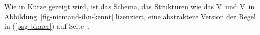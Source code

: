 Wie in Kürze gezeigt wird, ist das Schema, das Strukturen wie das V\,\eliste{} und V\, in
Abbildung~\ref{fig-niemand-ihn-kennt} lizenziert, eine abstraktere Version der Regel in (\ref{psg-binaer}) auf Seite~\pageref{psg-binaer}.



%

